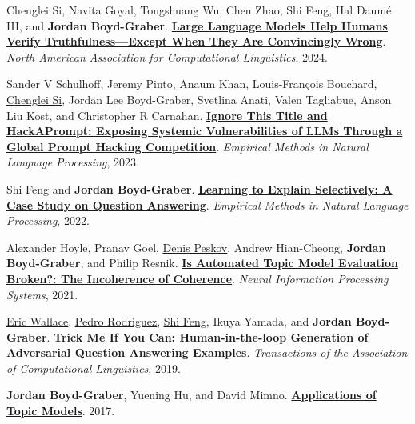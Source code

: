 \documentclass[10pt,a4paper]{article} %
\begin{document}
\begin{multicols}{2}  %

\small

\begin{enumerate*}

\item Chenglei Si, Navita Goyal, Tongshuang Wu, Chen Zhao, Shi Feng, Hal Daum\'{e} {III}, and {\bf Jordan Boyd-Graber}.  {\bf \href{http://cs.umd.edu/~jbg//docs/2024_naacl_convincingly.pdf}{Large Language Models Help Humans Verify Truthfulness---Except When They Are Convincingly Wrong}}.  \emph{North American Association for Computational Linguistics}, 2024.
  
\item Sander V Schulhoff, Jeremy Pinto, Anaum Khan, Louis-François Bouchard, \underline{\href{https://noviscl.github.io/}{Chenglei Si}}, Jordan Lee Boyd-Graber, Svetlina Anati, Valen Tagliabue, Anson Liu Kost, and Christopher R Carnahan.  {\bf \href{http://umiacs.umd.edu/~jbg//docs/2023_emnlp_hackaprompt.pdf}{Ignore This Title and HackAPrompt: Exposing Systemic Vulnerabilities of LLMs Through a Global Prompt Hacking Competition}}.  \emph{Empirical Methods in Natural Language Processing}, 2023.

\item Shi Feng and {\bf Jordan Boyd-Graber}.  {\bf \href{http://cs.umd.edu/~jbg//docs/2022_emnlp_augment.pdf}{Learning to Explain Selectively: A Case Study on Question Answering}}.  \emph{Empirical Methods in Natural Language Processing}, 2022.
  
	 \item Alexander Hoyle, Pranav Goel, \underline{\href{http://denispeskov.github.io/}{Denis Peskov}}, Andrew Hian-Cheong, {\bf Jordan Boyd-Graber}, and Philip Resnik.  {\bf \href{http://umiacs.umd.edu/~jbg//docs/2021_neurips_incoherence.pdf}{Is Automated Topic Model Evaluation Broken?: The Incoherence of Coherence}}.  \emph{Neural Information Processing Systems}, 2021.

  
\item \underline{\href{http://www.ericswallace.com/}{Eric Wallace}}, \underline{\href{https://www.pedro.ai}{Pedro Rodriguez}}, \underline{\href{http://users.umiacs.umd.edu/~shifeng/}{Shi Feng}}, Ikuya Yamada, and {\bf Jordan Boyd-Graber}.  {\bf Trick Me If You Can: Human-in-the-loop Generation of Adversarial Question Answering Examples}.  \emph{Transactions of the Association of Computational Linguistics}, 2019.

\item {\bf Jordan Boyd-Graber}, Yuening Hu, and David Mimno.  {\bf \href{http://www.nowpublishers.com/article/Details/INR-030}{Applications of Topic Models}}.  2017.


\end{enumerate*}
\end{multicols}
\end{document}

